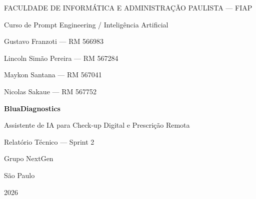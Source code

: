 \documentclass[12pt,a4paper]{article}
\begin{document}
\begin{titlepage}
\begin{center}

{\large FACULDADE DE INFORMÁTICA E ADMINISTRAÇÃO PAULISTA --- FIAP\par}
{\large Curso de Prompt Engineering / Inteligência Artificial\par}

\vspace{1.5cm}

{\large Gustavo Franzoti --- RM 566983\par}
{\large Lincoln Simão Pereira --- RM 567284\par}
{\large Maykon Santana --- RM 567041\par}
{\large Nicolas Sakaue --- RM 567752\par}

\vfill

{\LARGE\bfseries BluaDiagnostics\par}
\vspace{0.4cm}
{\large Assistente de IA para Check-up Digital e Prescrição Remota\par}
\vspace{0.3cm}
{\large Relatório Técnico --- Sprint 2\par}

\vfill

{\large Grupo NextGen\par}

\vspace{1.5cm}

{\large São Paulo\par}
{\large 2026\par}

\end{center}
\end{titlepage}
\end{document}
